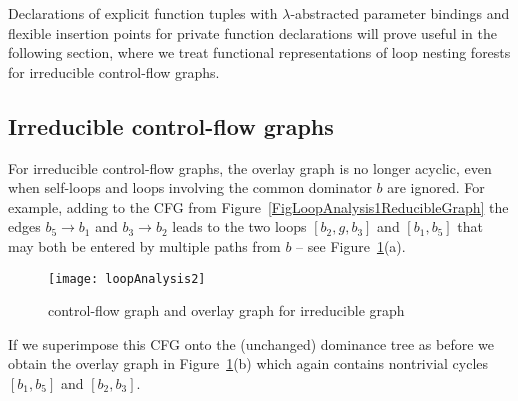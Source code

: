 Declarations of explicit function tuples with $\lambda$-abstracted
parameter bindings and flexible insertion points for private function
declarations will prove useful in the following section, where we
treat functional representations of loop nesting forests for
irreducible control-flow graphs.

\subsection{Irreducible control-flow graphs}
For irreducible control-flow graphs, the overlay graph is no longer
acyclic, even when self-loops and loops involving the common dominator
$b$ are ignored. For example, adding to the CFG from
Figure~\ref{FigLoopAnalysis1ReducibleGraph} the edges $b_5 \to b_1$
and $b_3 \to b_2$ leads to the two loops $[b_2,g,b_3]$ and $[b_1,b_5]$
that may both be entered by multiple paths from $b$ -- see
Figure~\ref{FigLoopAnalysis2IrreducibleGraph}(a).

\begin{figure}
\begin{center}
\texttt{[image: loopAnalysis2]}
\end{center}
\caption{\label{FigLoopAnalysis2IrreducibleGraph} control-flow graph and overlay graph for irreducible graph}
\end{figure}
If we superimpose this CFG onto the (unchanged) dominance tree as
before we obtain the overlay graph in
Figure~\ref{FigLoopAnalysis2IrreducibleGraph}(b) which again contains
nontrivial cycles $[b_1,b_5]$ and $[b_2,b_3]$.

